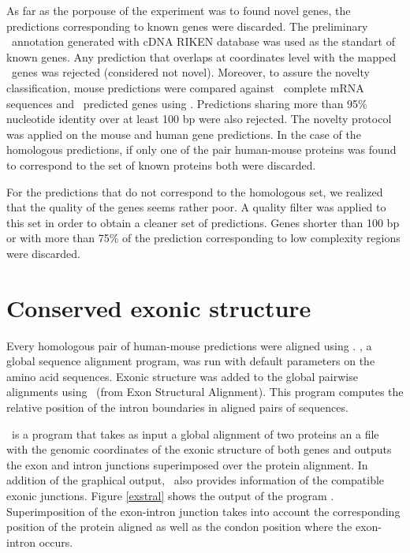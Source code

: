 
As far as the porpouse of the experiment was to found novel genes, the
predictions corresponding to known genes were discarded. The
preliminary \ensembl\ annotation generated with cDNA RIKEN database
was used as the standart of known genes. Any prediction that overlaps
at coordinates level with the mapped \ensembl\ genes was rejected
(considered not novel). Moreover, to assure the novelty
classification, mouse predictions were compared against \
complete mRNA sequences and \ensembl\ predicted genes using
\bln. Predictions sharing more than 95\% nucleotide identity over at
least 100 bp were also rejected. The novelty protocol was applied on
the mouse and human gene predictions.  In the case of the homologous
predictions, if only one of the pair human-mouse proteins was found to
correspond to the set of known proteins both were discarded.


For the predictions that do not correspond to the homologous set, we
realized that the quality of the genes seems rather poor. A quality
filter was applied to this set in order to obtain a cleaner set of
predictions. Genes shorter than 100 bp or with more than 75\% of the
prediction corresponding to low complexity regions were discarded.


 

\section{Conserved exonic structure}

Every homologous pair of human-mouse predictions were aligned using
\tcoffee. \tcoffee, a global sequence alignment program, was run with
default parameters on the amino acid sequences. Exonic structure was
added to the global pairwise alignments using \exstral\ (from Exon
Structural Alignment). This program computes the relative position of
the intron boundaries in aligned pairs of sequences.

\exstral\ is a program that takes as input a global alignment of two
proteins an a file with the genomic coordinates of the exonic
structure of both genes and outputs the exon and intron junctions
superimposed over the protein alignment. In addition of the graphical
output, \exstral\ also provides information of the compatible exonic
junctions.  Figure \ref{exstral} shows the output of the program
\exstral. Superimposition of the exon-intron junction takes into
account the corresponding position of the protein aligned as well as
the condon position where the exon-intron occurs.

